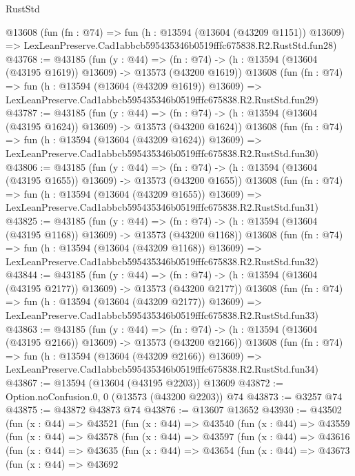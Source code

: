 \begin{lexlean}{RustStd}
\begin{coremodule}
    @13608
    (fun (fn : @74) =>
    fun (h : @13594 (@13604 (@43209 @1151)) @13609) =>
    LexLeanPreserve.Cad1abbcb595435346b0519fffc675838.R2.RustStd.fun28)
@43768 := @43185
    (fun (y : @44) =>
    (fn : @74) -> (h : @13594 (@13604 (@43195 @1619)) @13609) -> @13573 (@43200 @1619))
    @13608
    (fun (fn : @74) =>
    fun (h : @13594 (@13604 (@43209 @1619)) @13609) =>
    LexLeanPreserve.Cad1abbcb595435346b0519fffc675838.R2.RustStd.fun29)
@43787 := @43185
    (fun (y : @44) =>
    (fn : @74) -> (h : @13594 (@13604 (@43195 @1624)) @13609) -> @13573 (@43200 @1624))
    @13608
    (fun (fn : @74) =>
    fun (h : @13594 (@13604 (@43209 @1624)) @13609) =>
    LexLeanPreserve.Cad1abbcb595435346b0519fffc675838.R2.RustStd.fun30)
@43806 := @43185
    (fun (y : @44) =>
    (fn : @74) -> (h : @13594 (@13604 (@43195 @1655)) @13609) -> @13573 (@43200 @1655))
    @13608
    (fun (fn : @74) =>
    fun (h : @13594 (@13604 (@43209 @1655)) @13609) =>
    LexLeanPreserve.Cad1abbcb595435346b0519fffc675838.R2.RustStd.fun31)
@43825 := @43185
    (fun (y : @44) =>
    (fn : @74) -> (h : @13594 (@13604 (@43195 @1168)) @13609) -> @13573 (@43200 @1168))
    @13608
    (fun (fn : @74) =>
    fun (h : @13594 (@13604 (@43209 @1168)) @13609) =>
    LexLeanPreserve.Cad1abbcb595435346b0519fffc675838.R2.RustStd.fun32)
@43844 := @43185
    (fun (y : @44) =>
    (fn : @74) -> (h : @13594 (@13604 (@43195 @2177)) @13609) -> @13573 (@43200 @2177))
    @13608
    (fun (fn : @74) =>
    fun (h : @13594 (@13604 (@43209 @2177)) @13609) =>
    LexLeanPreserve.Cad1abbcb595435346b0519fffc675838.R2.RustStd.fun33)
@43863 := @43185
    (fun (y : @44) =>
    (fn : @74) -> (h : @13594 (@13604 (@43195 @2166)) @13609) -> @13573 (@43200 @2166))
    @13608
    (fun (fn : @74) =>
    fun (h : @13594 (@13604 (@43209 @2166)) @13609) =>
    LexLeanPreserve.Cad1abbcb595435346b0519fffc675838.R2.RustStd.fun34)
@43867 := @13594 (@13604 (@43195 @2203)) @13609
@43872 := Option.noConfusion.{0, 0} (@13573 (@43200 @2203)) @74
@43873 := @3257 @74
@43875 := @43872 @43873 @74
@43876 := @13607 @13652
@43930 := @43502
    (fun (x : @44) =>
    @43521
      (fun (x : @44) =>
      @43540
        (fun (x : @44) =>
        @43559
          (fun (x : @44) =>
          @43578
            (fun (x : @44) =>
            @43597
              (fun (x : @44) =>
              @43616
                (fun (x : @44) =>
                @43635
                  (fun (x : @44) =>
                  @43654
                    (fun (x : @44) =>
                    @43673
                      (fun (x : @44) =>
                      @43692

\end{coremodule}
\end{lexlean}
